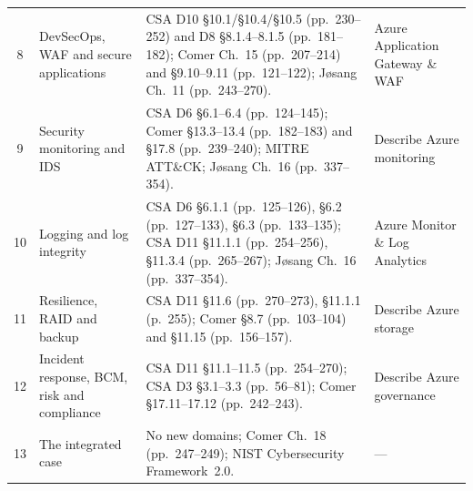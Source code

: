 {\begin{longtable}{@{}c p{2.4cm} p{7.9cm} p{2.5cm}@{}}
8 & DevSecOps, WAF and secure applications &
CSA D10 \S10.1/\S10.4/\S10.5 (pp.~230--252) and D8 \S8.1.4--8.1.5
(pp.~181--182); Comer Ch.~15 (pp.~207--214) and \S9.10--9.11 (pp.~121--122);
J\o sang Ch.~11 (pp.~243--270). &
Azure Application Gateway \& WAF \\

9 & Security monitoring and IDS &
CSA D6 \S6.1--6.4 (pp.~124--145); Comer \S13.3--13.4 (pp.~182--183) and \S17.8
(pp.~239--240); MITRE ATT\&CK; J\o sang Ch.~16 (pp.~337--354). &
Describe Azure monitoring \\

10 & Logging and log integrity &
CSA D6 \S6.1.1 (pp.~125--126), \S6.2 (pp.~127--133), \S6.3 (pp.~133--135); CSA
D11 \S11.1.1 (pp.~254--256), \S11.3.4 (pp.~265--267); J\o sang Ch.~16 (pp.~337--354). &
Azure Monitor \& Log Analytics \\

11 & Resilience, RAID and backup &
CSA D11 \S11.6 (pp.~270--273), \S11.1.1 (p.~255); Comer \S8.7 (pp.~103--104)
and \S11.15 (pp.~156--157). &
Describe Azure storage \\

12 & Incident response, BCM, risk and compliance &
CSA D11 \S11.1--11.5 (pp.~254--270); CSA D3 \S3.1--3.3 (pp.~56--81); Comer
\S17.11--17.12 (pp.~242--243). &
Describe Azure governance \\

13 & The integrated case &
No new domains; Comer Ch.~18 (pp.~247--249); NIST Cybersecurity Framework~2.0. &
--- \\

\end{longtable}
}
